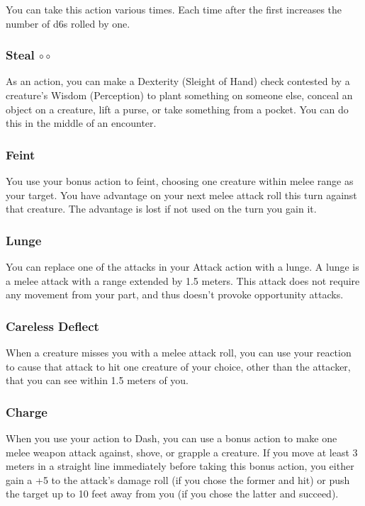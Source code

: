     You can take this action various times.
    Each time after the first increases the number of d6s rolled by one.

\subsubsection{Steal $\circ\circ$} \label{act::steal}
    As an action, you can make a Dexterity (Sleight of Hand) check contested by a creature's Wisdom (Perception) to plant something on someone else, conceal an object on a creature, lift a purse, or take something from a pocket.
    You can do this in the middle of an encounter.

\subsubsection{Feint} \label{tec::feint}
You use your bonus action to feint, choosing one creature within melee range as your target.
You have advantage on your next melee attack roll this turn against that creature.
The advantage is lost if not used on the turn you gain it.

\subsubsection{Lunge} \label{tec::lunge}
You can replace one of the attacks in your Attack action with a lunge.
A lunge is a melee attack with a range extended by 1.5 meters.
This attack does not require any movement from your part, and thus doesn't provoke opportunity attacks.

\subsubsection{Careless Deflect} \label{tec::carelessdeflect}
When a creature misses you with a melee attack roll, you can use your reaction to cause that attack to hit one creature of your choice, other than the attacker, that you can see within 1.5 meters of you.

\subsubsection{Charge} \label{tec::charge}
When you use your action to Dash, you can use a bonus action to make one melee weapon attack against, shove, or grapple a creature.
If you move at least 3 meters in a straight line immediately before taking this bonus action, you either gain a +5 to the attack's damage roll (if you chose the former and hit) or push the target up to 10 feet away from you (if you chose the latter and succeed).

